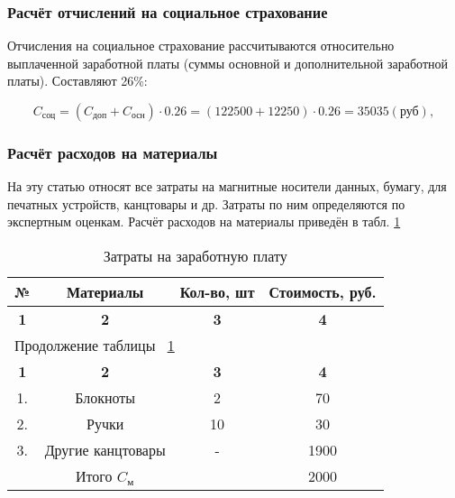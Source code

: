 \subsubsection*{Расчёт отчислений на социальное страхование}
Отчисления на социальное страхование рассчитываются относительно выплаченной заработной платы (суммы основной и
дополнительной заработной платы). Составляют 26\%:

\begin{equation}
C_{\mbox{соц}} = (C_{\mbox{доп}} + C_{\mbox{осн}}) \cdot 0.26 = (122500 + 12250) \cdot 0.26 = 35035 (\mbox{руб}),
\end{equation}

\subsubsection*{Расчёт расходов на материалы}
На эту статью относят все затраты на магнитные носители данных, бумагу, для печатных устройств, канцтовары и др.
Затраты по ним определяются по экспертным оценкам. Расчёт расходов на материалы приведён в табл. \ref{tab:eco_zatnm}

\begin{center}
\begin{longtable}{|c|c|c|c|}
\caption{Затраты на заработную плату} \label{tab:eco_zatnm} \\ \hline
\multicolumn{1}{|c|}{\textbf{№}} & \multicolumn{1}{c|}{\textbf{Материалы}} & 
\multicolumn{1}{c|}{\textbf{Кол-во, шт}} &   \multicolumn{1}{c|}{\textbf{Стоимость, руб.}} \\ \hline

\multicolumn{1}{|c|}{\textbf{1}} &   \multicolumn{1}{c|}{\textbf{2}} & 
\multicolumn{1}{c|}{\textbf{3}} &   \multicolumn{1}{c|}{\textbf{4}} \\ \hline
\endfirsthead

\multicolumn{4}{|l|}{{Продолжение таблицы ~\ref{tab:eco_zatnm}}} \\ %
\hline
\multicolumn{1}{|c|}{\textbf{1}} &   \multicolumn{1}{c|}{\textbf{2}} & 
\multicolumn{1}{c|}{\textbf{3}} &   \multicolumn{1}{c|}{\textbf{4}} \\ \hline
\endhead

\endfoot

\hline
\endlastfoot

1. & Блокноты & 2 & 70  \\ \hline
2. & Ручки & 10 & 30  \\ \hline
3. & Другие канцтовары & - & 1900 \\ \hline
 & Итого ${C_{\mbox{м}}}$ & & 2000 \\

\hline

\end{longtable}
\end{center}

